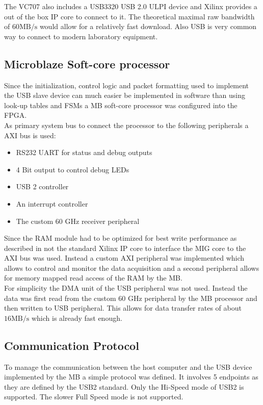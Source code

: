 The VC707 also includes a USB3320 USB 2.0 ULPI device and Xilinx provides
a out of the box \gls{IP} core to connect to it. The theoretical maximal
raw bandwidth of $60 \text{MB}/\text{s}$ would allow for a relatively fast
download. Also \gls{USB} is very common way to connect to modern laboratory
equipment.

\subsection{Microblaze Soft-core processor}
Since the initialization, control logic and packet formatting
used to implement the \gls{USB} slave device can much easier be implemented
in software than using look-up tables and \glspl{FSM} a
\gls{MB} soft-core processor was configured into the \gls{FPGA}. \\

As primary system bus to connect the processor to the following peripherals
a \gls{AXI} bus is used:
\begin{itemize}
\item RS232 \gls{UART} for status and debug outputs
\item 4 Bit output to control debug \glspl{LED}
\item USB 2 controller
\item An interrupt controller
\item The custom 60 GHz receiver peripheral
\end{itemize}

Since the \gls{RAM} module had to be optimized for best write performance
as described in  not the standard Xilinx \gls{IP}
core to interface the \gls{MIG} core to the \gls{AXI} bus was used.
Instead a custom \gls{AXI} peripheral was implemented which allows to
control and monitor the data acquisition and a second peripheral allows
for memory mapped read access of the \gls{RAM} by the \gls{MB}. \\

For simplicity the \gls{DMA} unit of the \gls{USB} peripheral was not used.
Instead the data was first read from the custom 60 GHz peripheral
by the \gls{MB} processor and then written to \gls{USB} peripheral.
This allows for data transfer rates of about $16 \text{MB} / \text{s}$
which is already fast enough. \\

\subsection{Communication Protocol}
To manage the communication between the host computer and the \gls{USB} device
implemented by the \gls{MB} a simple protocol was defined.
It involves 5 endpoints as they are defined by the \gls{USB}2 standard.
Only the Hi-Speed mode of \gls{USB}2 is supported. The slower Full Speed mode
is not supported. \\

